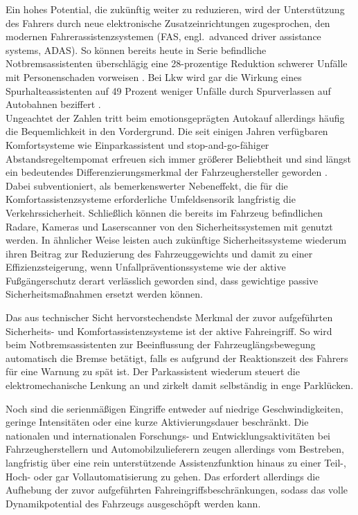 Ein hohes Potential, die  zukünftig weiter zu reduzieren, wird der Unterstützung des Fahrers durch neue elektronische Zusatzeinrichtungen zugesprochen, den modernen Fahrerassistenzsystemen \cite{handbuchFAS_Winner, maurer2005fahrerassistenzsysteme, eskandarian2012handbook, Bishop2005} (FAS, engl.\ advanced driver assistance systems, ADAS).
So können bereits heute in Serie befindliche %
Notbremsassistenten überschlägig 
eine %
28-prozentige Reduktion schwerer Unfälle mit Personenschaden vorweisen \cite{gdv2009}.
Bei Lkw wird gar die Wirkung eines Spurhalteassistenten auf 49 Prozent weniger Unfälle durch Spurverlassen auf Autobahnen beziffert \cite{azt2006}. \\
Ungeachtet der Zahlen tritt beim emotionsgeprägten Autokauf allerdings häufig die Bequemlichkeit in den Vordergrund. Die seit einigen Jahren verfügbaren Komfortsysteme wie Einparkassistent und stop-and-go-fähiger Abstandsregeltempomat erfreuen sich immer größerer Beliebtheit und sind längst ein bedeutendes Differenzierungsmerkmal der Fahrzeughersteller geworden \cite{lewandowitz2011markenspezifische}.
Dabei subventioniert, als bemerkenswerter Nebeneffekt, die für die Komfortassistenzsysteme erforderliche Umfeldsensorik langfristig die Verkehrssicherheit. Schließlich können die bereits im Fahrzeug befindlichen Radare, Kameras und Laserscanner von den Sicherheitssystemen mit genutzt werden. In ähnlicher Weise leisten auch zukünftige Sicherheitssysteme wiederum ihren Beitrag zur Reduzierung des Fahrzeuggewichts und damit zu einer Effizienzsteigerung, wenn Unfallpräventionssysteme wie der aktive Fußgängerschutz derart verlässlich geworden sind, dass gewichtige passive Sicherheitsmaßnahmen ersetzt werden können. %

Das aus technischer Sicht hervorstechendste Merkmal der zuvor aufgeführten Sicherheits- und Komfortassistenzsysteme ist der aktive Fahreingriff. So wird beim Notbremsassistenten zur Beeinflussung der Fahrzeuglängsbewegung automatisch die Bremse betätigt, falls es aufgrund der Reaktionszeit des Fahrers für eine Warnung zu spät ist. Der Parkassistent wiederum steuert die elektromechanische Lenkung an und zirkelt damit selbständig in enge Parklücken.

Noch sind die serienmäßigen Eingriffe entweder auf niedrige Geschwindigkeiten, geringe Intensitäten oder eine kurze Aktivierungsdauer beschränkt. Die nationalen und internationalen Forschungs- und Entwicklungsaktivitäten bei Fahrzeugherstellern und Automobilzulieferern zeugen allerdings vom Bestreben, langfristig über eine rein unterstützende Assistenzfunktion hinaus zu einer Teil-, Hoch- oder gar Vollautomatisierung \cite{bast2012_rechtsfolgen} zu gehen. Das erfordert allerdings die Aufhebung der zuvor aufgeführten Fahreingriffsbeschränkungen, sodass das volle Dynamikpotential des Fahrzeugs ausgeschöpft werden kann.


